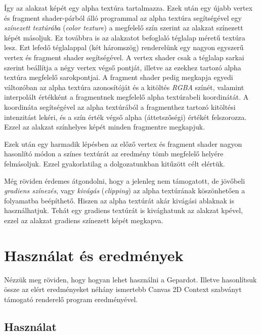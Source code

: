 \documentclass[12pt]{report}
\theoremstyle{definition}
\newcommand{\inenglish}[1]{\textsl{#1}}
\newcommand{\func}[1]{{\textsl{#1}}}
\begin{document}
Így az alakzat képét egy alpha textúra tartalmazza. Ezek után egy újabb vertex
és fragment shader-párból álló programmal az alpha textúra segítségével egy
\emph{színezett textúrába} (\inenglish{color texture}) a megfelelő szín szerint
az alakzat színezett képét másoljuk. Ez továbbra is az alakzatot befoglaló
téglalap méretű textúra lesz. Ezt lefedő téglalappal (két háromszög)
renderelünk egy nagyon egyszerű vertex és fragment shader segítségével. A
vertex shader csak a téglalap sarkai szerint beállítja a négy vertex végső
pontját, illetve az ezekhez tartozó alpha textúra megfelelő sarokpontjai. A
fragment shader pedig megkapja egyedi változóban az alpha textúra azonosítóját
és a kitöltés \func{RGBA} színét, valamint interpolált értékként a fragmentnek
megfelelő alpha textúrabeli koordinátát. A koordináta segítségével az alpha
textúrából a fragmenthez tartozó kitöltési intenzitást lekéri, és a szín érték
végső alpha (áttetszőségi) értékét felszorozza. Ezzel az alakzat színhelyes
képét minden fragmentre megkapjuk.

Ezek után egy harmadik lépésben az előző vertex és fragment shader nagyon
hasonlító módon a színes textúrát az eredmény tömb megfelelő helyére
felmásoljuk. Ezzel gyakorlatilag a dolgozatunkban kitűzött célt elértük.

Még röviden érdemes átgondolni, hogy a jelenleg nem támogatott, de jövőbeli
\emph{gradiens színezés}, vagy \emph{kivágás} (\inenglish{clipping}) az alpha
textúrának köszönhetően a folyamatba beépíthető. Hiszen az alpha textúrát akár
kivágási ablaknak is használhatjuk. Tehát egy gradiens textúrát is kivághatunk
az alakzat kpével, ezzel az alakzat gradiens színezett képét megkapva.



    \chapter{Használat és eredmények}

Nézzük meg röviden, hogy hogyan lehet használni a Gepardot. Illetve
hasonlítsuk össze az elért eredményeket néhány ismertebb Canvas 2D Context
szabványt támogató renderelő program eredményével.

    \section{Használat}
\end{document}
